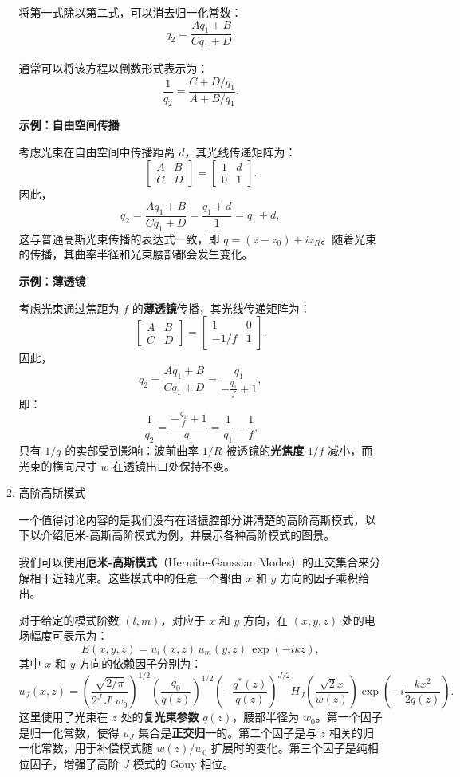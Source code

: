 \begin{enumerate}
\begin{enumerate}
		将第一式除以第二式，可以消去归一化常数：
		\[
		q_2 = \frac{A q_1 + B}{C q_1 + D}.
		\]
		
		通常可以将该方程以倒数形式表示为：
		\[
		\frac{1}{q_2} = \frac{C + D/q_1}{A + B/q_1}.
		\]
		
		\textbf{示例：自由空间传播}
		
		考虑光束在自由空间中传播距离 $d$，其光线传递矩阵为：
		\[
		\begin{bmatrix}
			A & B \\
			C & D
		\end{bmatrix}
		= \begin{bmatrix}
			1 & d \\
			0 & 1
		\end{bmatrix}.
		\]
		因此，
		\[
		q_2 = \frac{A q_1 + B}{C q_1 + D} = \frac{q_1 + d}{1} = q_1 + d,
		\]
		这与普通高斯光束传播的表达式一致，即 $q = (z - z_0) + i z_R$。随着光束的传播，其曲率半径和光束腰部都会发生变化。
		
		\textbf{示例：薄透镜}
		
		考虑光束通过焦距为 $f$ 的\textbf{薄透镜}传播，其光线传递矩阵为：
		\[
		\begin{bmatrix}
			A & B \\
			C & D
		\end{bmatrix}
		= \begin{bmatrix}
			1 & 0 \\
			-1/f & 1
		\end{bmatrix}.
		\]
		因此，
		\[
		q_2 = \frac{A q_1 + B}{C q_1 + D} = \frac{q_1}{-\frac{q_1}{f} + 1},
		\]
		即：
		\[
		\frac{1}{q_2} = \frac{-\frac{q_1}{f} + 1}{q_1} = \frac{1}{q_1} - \frac{1}{f}.
		\]
		只有 $1/q$ 的实部受到影响：波前曲率 $1/R$ 被透镜的\textbf{光焦度} $1/f$ 减小，而光束的横向尺寸 $w$ 在透镜出口处保持不变。
		
		\item 高阶高斯模式
		
		一个值得讨论内容的是我们没有在谐振腔部分讲清楚的高阶高斯模式，以下以介绍厄米-高斯高阶模式为例，并展示各种高阶模式的图景。
		
		我们可以使用\textbf{厄米-高斯模式}（Hermite-Gaussian Modes）的正交集合来分解相干近轴光束。这些模式中的任意一个都由 $x$ 和 $y$ 方向的因子乘积给出。
		
		对于给定的模式阶数 $(l, m)$，对应于 $x$ 和 $y$ 方向，在 $(x, y, z)$ 处的电场幅度可表示为：
		\[
		E(x, y, z) = u_l(x, z) \, u_m(y, z) \, \exp(-ikz),
		\]
		其中 $x$ 和 $y$ 方向的依赖因子分别为：
		\[
		u_J(x, z) = \left(\frac{\sqrt{2/\pi}}{2^J \, J! \, w_0}\right)^{1/2} \left( \frac{q_0}{q(z)} \right)^{1/2} \left(-\frac{q^\ast(z)}{q(z)}\right)^{J/2} H_J\left(\frac{\sqrt{2}x}{w(z)}\right) \exp\left(-i \frac{k x^2}{2 q(z)}\right).
		\]
		这里使用了光束在 $z$ 处的\textbf{复光束参数} $q(z)$，腰部半径为 $w_0$。第一个因子是归一化常数，使得 $u_J$ 集合是\textbf{正交归一}的。第二个因子是与 $z$ 相关的归一化常数，用于补偿模式随 $w(z)/w_0$ 扩展时的变化。第三个因子是纯相位因子，增强了高阶 $J$ 模式的 Gouy 相位。
		

\end{enumerate}
\end{enumerate}
